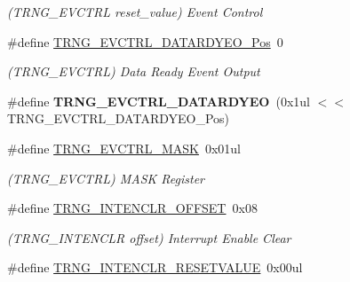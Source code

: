 \begin{DoxyCompactItemize}
\begin{DoxyCompactList}\small\item\em (T\+R\+N\+G\+\_\+\+E\+V\+C\+T\+R\+L reset\+\_\+value) Event Control \end{DoxyCompactList}\item 
\hypertarget{group___s_a_m_l21___t_r_n_g_gaddca7d936ccd5ec3bcdb339ea1131809}{}\#define \hyperlink{group___s_a_m_l21___t_r_n_g_gaddca7d936ccd5ec3bcdb339ea1131809}{T\+R\+N\+G\+\_\+\+E\+V\+C\+T\+R\+L\+\_\+\+D\+A\+T\+A\+R\+D\+Y\+E\+O\+\_\+\+Pos}~0\label{group___s_a_m_l21___t_r_n_g_gaddca7d936ccd5ec3bcdb339ea1131809}

\begin{DoxyCompactList}\small\item\em (T\+R\+N\+G\+\_\+\+E\+V\+C\+T\+R\+L) Data Ready Event Output \end{DoxyCompactList}\item 
\hypertarget{group___s_a_m_l21___t_r_n_g_gae74d9b2d598ff1e3743bca7702225ccd}{}\#define {\bfseries T\+R\+N\+G\+\_\+\+E\+V\+C\+T\+R\+L\+\_\+\+D\+A\+T\+A\+R\+D\+Y\+E\+O}~(0x1ul $<$$<$ T\+R\+N\+G\+\_\+\+E\+V\+C\+T\+R\+L\+\_\+\+D\+A\+T\+A\+R\+D\+Y\+E\+O\+\_\+\+Pos)\label{group___s_a_m_l21___t_r_n_g_gae74d9b2d598ff1e3743bca7702225ccd}

\item 
\hypertarget{group___s_a_m_l21___t_r_n_g_gaab9f39025f13b4fa6fedd123ec75b40c}{}\#define \hyperlink{group___s_a_m_l21___t_r_n_g_gaab9f39025f13b4fa6fedd123ec75b40c}{T\+R\+N\+G\+\_\+\+E\+V\+C\+T\+R\+L\+\_\+\+M\+A\+S\+K}~0x01ul\label{group___s_a_m_l21___t_r_n_g_gaab9f39025f13b4fa6fedd123ec75b40c}

\begin{DoxyCompactList}\small\item\em (T\+R\+N\+G\+\_\+\+E\+V\+C\+T\+R\+L) M\+A\+S\+K Register \end{DoxyCompactList}\item 
\hypertarget{group___s_a_m_l21___t_r_n_g_ga168af6f11b5028346211cb01fa56a35e}{}\#define \hyperlink{group___s_a_m_l21___t_r_n_g_ga168af6f11b5028346211cb01fa56a35e}{T\+R\+N\+G\+\_\+\+I\+N\+T\+E\+N\+C\+L\+R\+\_\+\+O\+F\+F\+S\+E\+T}~0x08\label{group___s_a_m_l21___t_r_n_g_ga168af6f11b5028346211cb01fa56a35e}

\begin{DoxyCompactList}\small\item\em (T\+R\+N\+G\+\_\+\+I\+N\+T\+E\+N\+C\+L\+R offset) Interrupt Enable Clear \end{DoxyCompactList}\item 
\hypertarget{group___s_a_m_l21___t_r_n_g_ga091b467750e4232f5b971b427128da69}{}\#define \hyperlink{group___s_a_m_l21___t_r_n_g_ga091b467750e4232f5b971b427128da69}{T\+R\+N\+G\+\_\+\+I\+N\+T\+E\+N\+C\+L\+R\+\_\+\+R\+E\+S\+E\+T\+V\+A\+L\+U\+E}~0x00ul\label{group___s_a_m_l21___t_r_n_g_ga091b467750e4232f5b971b427128da69}


\end{DoxyCompactItemize}
